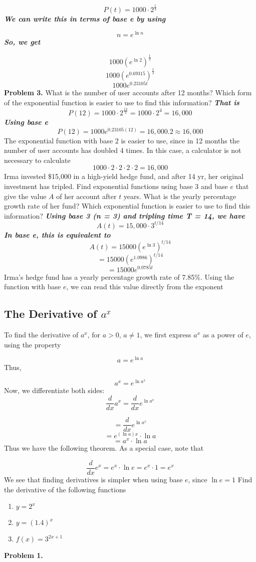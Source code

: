 \documentclass{report}
\begin{document}
$$ P(t) = 1000 \cdot 2^{\frac{t}{3}}$$
\textit{\textbf{We can write this in terms of base e by using}}

$$ n = e^{\ln{n}}$$
\textit{\textbf{So, we get}}

$$ 1000(e^{\ln{2}})^{\frac{t}{3}}$$
$$ 1000(e^{0.69315})^{\frac{t}{3}}$$
$$ 1000e^{0.23105t}$$
\bigbreak \noindent
\textbf{Problem 3.} What is the number of user accounts after 12 months? Which form of the exponential function is easier to use to find this information?
\bigbreak \noindent
\textit{\textbf{That is}}
$$ P(12) = 1000 \cdot 2^{\frac {13}{3}} = 1000 \cdot 2^4 = 16,000$$
\textit{\textbf{Using base e}}
$$ P(12) = 1000e^{0.23105(12)} = 16,000.2 \approx 16,000$$
The exponential function with base 2 is easier to use, since in 12 months the number of user accounts has doubled 4 times. In this case, a calculator is not necessary to calculate
$$ 1000 \cdot 2 \cdot 2 \cdot 2 \cdot 2 = 16,000$$
\q
Irma invested \$15,000 in a high-yield hedge fund, and after 14 yr, her original investment has tripled. Find exponential functions using base 3 and base $e$ that give the value $A$ of her account after $t$ years. What is the yearly percentage growth rate of her fund? Which exponential function is easier to use to find this information?
\bigbreak \noindent
\textit{\textbf{Using base 3 (n = 3) and tripling time T = 14, we have}}
$$ A(t) = 15,000\cdot 3^{t/14}$$
\textit{\textbf{In base e, this is equivalent to }}
$$ A(t) = 15000(e^{\ln{3}})^{t/14}$$
$$ = 15000(e^{1.0986})^{t/14}$$
$$ = 15000e^{0.0785t}$$
Irma's hedge fund has a yearly percentage growth rate of 7.85\%. Using the function with base $e$, we can read this value directly from the exponent

\pagebreak
\subsection*{The Derivative of $a^x$}
To find the derivative of $a^x$, for $a > 0$, $a \neq 1$, we first express $a^x$ as a power of $e$, using the property

$$ a = e^{\ln{a}}$$
Thus,

$$ a^x = e^{\ln{a^x}}$$
Now, we differentiate both sides:
$$ \frac{d}{dx}a^x = \frac{d}{dx}e^{\ln{a^x}}$$

$$ = \frac{d}{dx}e^{\ln{a^x}}$$
$$ = e^{(\ln{a})x} \cdot \ln a$$
$$ = a^x \cdot \ln a$$
Thus we have the following theorem.
\noindent As a special case, note that

$$ \frac{d}{dx}e^x = e^x \cdot \ln{e} = e^x \cdot 1 = e^x$$
We see that finding derivatives is simpler when using base $e$, since $\ln{e} = 1$
\bigbreak \noindent
\q
Find the derivative of the following functions
\begin{enumerate}
  \item $y = 2^x$ 
  \item $y = (1.4)^x$
  \item $f(x) = 3^{2x+1}$
\end{enumerate}
\bigbreak \noindent \bigbreak \noindent
\textbf{Problem 1.}
\end{document}
